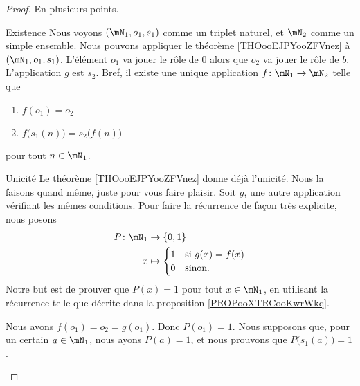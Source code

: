 \begin{proof}
	En plusieurs points.
	\begin{subproof}
		\item[Existence]
		Nous voyons \( (\mN_1, o_1, s_1)\) comme un triplet naturel, et \( \mN_2\) comme un simple ensemble. Nous pouvons appliquer le théorème \ref{THOooEJPYooZFVnez} à \( (\mN_1, o_1, s_1)\). L'élément \( o_1\) va jouer le rôle de \( 0\) alors que \( o_2\) va jouer le rôle de \( b\). L'application \( g\) est \( s_2\). Bref, il existe une unique application \( f\colon \mN_1\to \mN_2\) telle que
		\begin{enumerate}
			\item
			      \( f(o_1)=o_2\)
			\item
			      \( f\big( s_1(n) \big)=s_2\big( f(n) \big)\)
		\end{enumerate}
		pour tout \( n\in \mN_1\).
		\item[Unicité]
		Le théorème \ref{THOooEJPYooZFVnez} donne déjà l'unicité. Nous la faisons quand même, juste pour vous faire plaisir. Soit \( g\), une autre application vérifiant les mêmes conditions. Pour faire la récurrence de façon très explicite, nous posons
		\begin{equation}
			\begin{aligned}
				P\colon \mN_1 & \to \{ 0,1 \}                       \\
				x             & \mapsto \begin{cases}
					1 & \text{si } g(x)=f(x) \\
					0 & \text{sinon. }
				\end{cases}
			\end{aligned}
		\end{equation}
		Notre but est de prouver que \( P(x)=1\) pour tout \( x\in \mN_1\), en utilisant la récurrence telle que décrite dans la proposition \ref{PROPooXTRCooKwrWkq}.

		Nous avons \( f(o_1)=o_2=g(o_1)\). Donc \( P(o_1)=1\). Nous supposons que, pour un certain \( a\in \mN_1\), nous ayons \( P(a)=1\), et nous prouvons que \( P\big( s_1(a) \big)=1\).


\end{subproof}
\end{proof}
